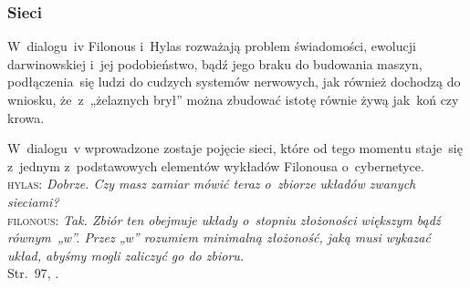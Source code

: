 \documentclass[10pt,t]{beamer}
\begin{document}
\begin{frame}
  \frametitle{Sieci}


  W~dialogu~iv Filonous i~Hylas rozważają problem świadomości, ewolucji
  darwinowskiej i~jej podobieństwo, bądź jego braku do budowania maszyn,
  podłączenia~się ludzi do cudzych systemów nerwowych, jak również dochodzą
  do wniosku, że~z~„żelaznych brył” można zbudować istotę równie żywą
  jak~koń czy krowa.

  W~dialogu~v wprowadzone zostaje pojęcie sieci, które od tego momentu
  staje~się z~jednym z~podstawowych elementów wykładów Filonousa
  o~cybernetyce. \\
  \textsc{hylas}: \textit{Dobrze. Czy masz zamiar mówić teraz o~zbiorze
    układów zwanych sieciami?} \\
  \textsc{filonous}: \textit{Tak. Zbiór ten obejmuje układy o~stopniu
    złożoności większym bądź równym~„w”. Przez „w” rozumiem minimalną
    złożoność, jaką musi wykazać układ, abyśmy mogli zaliczyć go do
    zbioru.} \\
  Str.~$97$, \parencite{Lem-Dialogi-Vol-I-Pub-1996}.

\end{frame}
\end{document}
